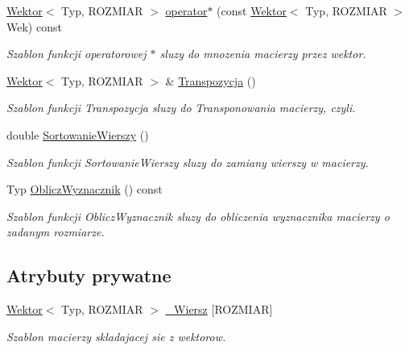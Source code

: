 \begin{DoxyCompactItemize}
\hyperlink{class_wektor}{Wektor}$<$ Typ, ROZMIAR $>$ \hyperlink{class_macierz_ac60295eba85e578dc300b1c3f0431684}{operator$\ast$} (const \hyperlink{class_wektor}{Wektor}$<$ Typ, ROZMIAR $>$ Wek) const 
\begin{DoxyCompactList}\small\item\em Szablon funkcji operatorowej $\ast$ sluzy do mnozenia macierzy przez wektor. \item\end{DoxyCompactList}\item 
\hyperlink{class_wektor}{Wektor}$<$ Typ, ROZMIAR $>$ \& \hyperlink{class_macierz_ab94e869cad4bc457c5796e20d5c34348}{Transpozycja} ()
\begin{DoxyCompactList}\small\item\em Szablon funkcji Transpozycja sluzy do Transponowania macierzy, czyli. \item\end{DoxyCompactList}\item 
double \hyperlink{class_macierz_a3d8e9e4fee3850b78b0caf5215b34893}{SortowanieWierszy} ()
\begin{DoxyCompactList}\small\item\em Szablon funkcji SortowanieWierszy sluzy do zamiany wierszy w macierzy. \item\end{DoxyCompactList}\item 
Typ \hyperlink{class_macierz_a57a50f518945cd9152a88f367cb23e9e}{ObliczWyznacznik} () const 
\begin{DoxyCompactList}\small\item\em Szablon funkcji ObliczWyznacznik sluzy do obliczenia wyznacznika macierzy o zadanym rozmiarze. \item\end{DoxyCompactList}\end{DoxyCompactItemize}
\subsection*{Atrybuty prywatne}
\begin{DoxyCompactItemize}
\item 
\hyperlink{class_wektor}{Wektor}$<$ Typ, ROZMIAR $>$ \hyperlink{class_macierz_a2b7a2db3b700ad190ff592c470a8afb3}{\_\-Wiersz} \mbox{[}ROZMIAR\mbox{]}
\begin{DoxyCompactList}\small\item\em Szablon macierzy skladajacej sie z wektorow. \item\end{DoxyCompactList}\end{DoxyCompactItemize}


